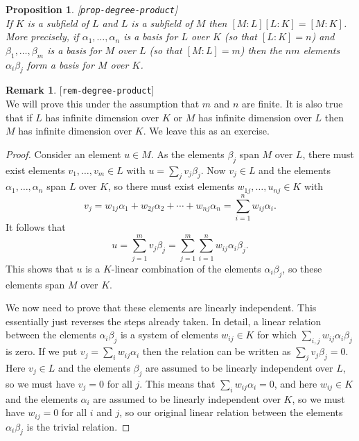 \documentclass{amsart}
\newcommand{\lbl}[1]{\label{#1}\textup{[\texttt{#1}]}\ \\}
\newcommand{\lbl}{\label}
\newcommand{\al}        {\alpha}
\newcommand{\bt}        {\beta}
\renewcommand{\:}{\colon}
\newtheorem{proposition}[theorem]{Proposition}
\theoremstyle{definition}
\newtheorem{remark}[theorem]{Remark}
\begin{document}
\begin{proposition}\lbl{prop-degree-product}
 If $K$ is a subfield of $L$ and $L$ is a subfield of $M$ then
 $[M:L][L:K]=[M:K]$.  More precisely, if $\al_1,\dotsc,\al_n$ is a
 basis for $L$ over $K$ (so that $[L:K]=n$) and $\bt_1,\dotsc,\bt_m$
 is a basis for $M$ over $L$ (so that $[M:L]=m$) then the $nm$
 elements $\al_i\bt_j$ form a basis for $M$ over $K$.
\end{proposition}
\begin{remark}\lbl{rem-degree-product}
 We will prove this under the assumption that $m$ and $n$ are finite.
 It is also true that if $L$ has infinite dimension over $K$ or $M$
 has infinite dimension over $L$ then $M$ has infinite dimension over
 $K$.  We leave this as an exercise.
\end{remark}
\begin{proof}
 Consider an element $u\in M$.  As the elements $\bt_j$ span $M$ over
 $L$, there must exist elements $v_1,\dotsc,v_m\in L$ with
 $u=\sum_jv_j\bt_j$.  Now $v_j\in L$ and the elements
 $\al_1,\dotsc,\al_n$ span $L$ over $K$, so there must exist elements
 $w_{1j},\dotsc,u_{nj}\in K$ with 
 \[ v_j = w_{1j}\al_1 + w_{2j}\al_2 + \dotsb + w_{nj} \al_n
        = \sum_{i=1}^n w_{ij}\al_i.
 \]
 It follows that
 \[ u = \sum_{j=1}^m v_j\bt_j =
      \sum_{j=1}^m\sum_{i=1}^n w_{ij}\al_i\bt_j. 
 \]
 This shows that $u$ is a $K$-linear combination of the elements
 $\al_i\bt_j$, so these elements span $M$ over $K$.

 We now need to prove that these elements are linearly independent.
 This essentially just reverses the steps already taken.  In detail, a
 linear relation between the elements $\al_i\bt_j$ is a system of
 elements $w_{ij}\in K$ for which $\sum_{i,j}w_{ij}\al_i\bt_j$ is
 zero.   If we put $v_j=\sum_iw_{ij}\al_i$ then the relation can be
 written as $\sum_jv_j\bt_j=0$.  Here $v_j\in L$ and the elements
 $\bt_j$ are assumed to be linearly independent over $L$, so we must
 have $v_j=0$ for all $j$.  This means that $\sum_iw_{ij}\al_i=0$, and
 here $w_{ij}\in K$ and the elements $\al_i$ are assumed to be
 linearly independent over $K$, so we must have $w_{ij}=0$ for all $i$
 and $j$, so our original linear relation between the elements
 $\al_i\bt_j$ is the trivial relation.
\end{proof}
\end{document}
